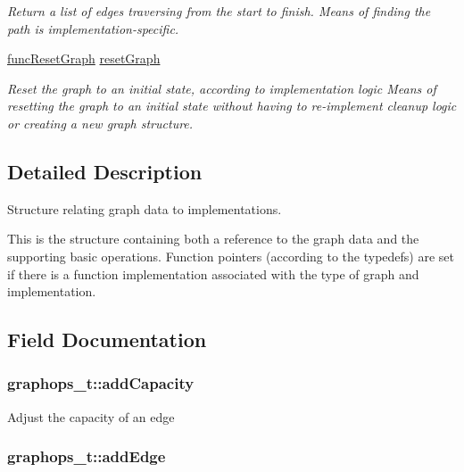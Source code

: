 \begin{DoxyCompactItemize}
\begin{DoxyCompactList}\small\item\em Return a list of edges traversing from the start to finish. Means of finding the path is implementation-\/specific. \end{DoxyCompactList}\item 
\hyperlink{graphops_8h_afbe0356f92d2a45740225f068371f4bc}{func\+Reset\+Graph} \hyperlink{structgraphops__t_a5e4e69eeeb8e25607c3af5dfcdbb88aa}{reset\+Graph}
\begin{DoxyCompactList}\small\item\em Reset the graph to an initial state, according to implementation logic Means of resetting the graph to an initial state without having to re-\/implement cleanup logic or creating a new graph structure. \end{DoxyCompactList}\end{DoxyCompactItemize}


\subsection{Detailed Description}
Structure relating graph data to implementations. 

This is the structure containing both a reference to the graph data and the supporting basic operations. Function pointers (according to the typedefs) are set if there is a function implementation associated with the type of graph and implementation. 

\subsection{Field Documentation}
\subsubsection[{\texorpdfstring{add\+Capacity}{addCapacity}}]{ graphops\+\_\+t\+::add\+Capacity}\hypertarget{structgraphops__t_aafe9596d5e7ae4ba579213c1f0c789c7}{}\label{structgraphops__t_aafe9596d5e7ae4ba579213c1f0c789c7}
Adjust the capacity of an edge 
\subsubsection[{\texorpdfstring{add\+Edge}{addEdge}}]{ graphops\+\_\+t\+::add\+Edge}\hypertarget{structgraphops__t_af9a74b6643b49f7799dfa78f4824aa22}{}\label{structgraphops__t_af9a74b6643b49f7799dfa78f4824aa22}


